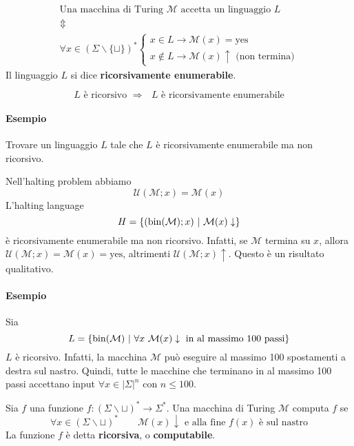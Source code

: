 \begin{definition}
    \begin{eqnarray*}
        &\text{Una macchina di Turing $\mathcal{M}$ accetta un linguaggio $L$}&\\
        &\Updownarrow&\\
        &\forall x\in(\Sigma\backslash\{\sqcup\})^* \begin{cases*}
            x\in L \to \mathcal{M}(x)=\text{yes}\\
            x\notin L \to \mathcal{M}(x)\uparrow \text{ (non termina)}
        \end{cases*}&
    \end{eqnarray*}
    Il linguaggio $L$ si dice \textbf{ricorsivamente enumerabile}.
\end{definition}

\begin{theorem}
    $$
        \text{$L$ è ricorsivo } \Rightarrow \text{ $L$ è ricorsivamente enumerabile}
    $$
\end{theorem}

\paragraph{Esempio} Trovare un linguaggio $L$ tale che $L$ è ricorsivamente enumerabile ma non ricorsivo.

Nell'halting problem abbiamo 
$$
    \mathcal{U}(\mathcal{M};x)=\mathcal{M}(x)
$$
L'halting language
$$
    H = \{ (\operatorname*{bin}(\mathcal{M});x) ~|~ \mathcal{M}(x)\downarrow \}
$$
è ricorsivamente enumerabile ma non ricorsivo. Infatti, se $\mathcal{M}$ termina su $x$, allora $\mathcal{U}(\mathcal{M};x)=\mathcal{M}(x)=\text{yes}$, altrimenti $\mathcal{U}(\mathcal{M};x)\uparrow$. Questo è un risultato qualitativo.

\paragraph{Esempio} Sia
$$
    L = \{ \operatorname*{bin}(\mathcal{M}) ~|~ \forall x~\mathcal{M}(x)\downarrow \text{ in al massimo 100 passi} \}
$$
$L$ è ricorsivo. Infatti, la macchina $\mathcal{M}$ può eseguire al massimo 100 spostamenti a destra sul nastro. Quindi, tutte le macchine che terminano in al massimo 100 passi accettano input $\forall x\in|\Sigma|^n$ con $n\leq 100$.

\begin{definition}
    Sia $f$ una funzione $f:(\Sigma\backslash\sqcup)^*\to\Sigma^*$. Una macchina di Turing $\mathcal{M}$ computa $f$ se
    $$
        \forall x\in(\Sigma\backslash\sqcup)^*\qquad \mathcal{M}(x)\downarrow \text{ e alla fine $f(x)$ è sul nastro}
    $$
    La funzione $f$ è detta \textbf{ricorsiva}, o \textbf{computabile}.
\end{definition}


